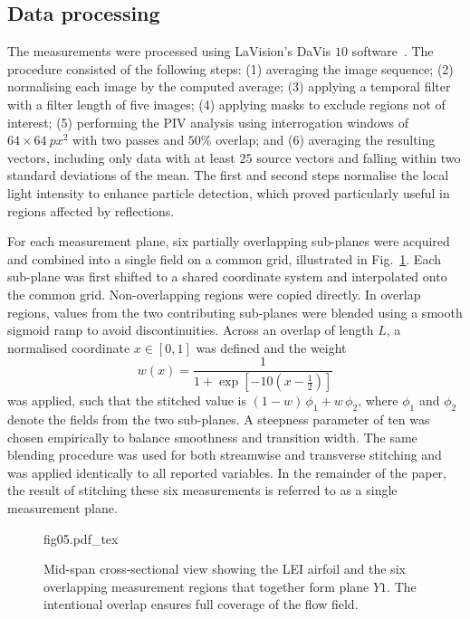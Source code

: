 \documentclass[wes, manuscript]{copernicus}
\begin{document}
\subsection{Data processing}
%
The measurements were processed using LaVision's DaVis $10$ software~\citep{lavision2025}. The procedure consisted of the following steps:
(1) averaging the image sequence;
(2) normalising each image by the computed average;
(3) applying a temporal filter with a filter length of five images;
(4) applying masks to exclude regions not of interest;
(5) performing the PIV analysis using interrogation windows of $64 \times 64~\unit{px^2}$
with two passes and $50\%$ overlap; and
(6) averaging the resulting vectors, including only data with at least $25$ source vectors and falling within two standard deviations of the mean. The first and second steps normalise the local light intensity to enhance particle detection, which proved particularly useful in regions affected by reflections.

For each measurement plane, six partially overlapping sub-planes were acquired and combined into a single field on a common grid, illustrated in Fig.~\ref{fig:overlapping_measurement_planes}. Each sub-plane was first shifted to a shared coordinate system and interpolated onto the common grid. Non-overlapping regions were copied directly. 
In overlap regions, values from the two contributing sub-planes were blended using a smooth sigmoid ramp to avoid discontinuities. Across an overlap of length $L$, a normalised coordinate $x\in[0,1]$ was defined and the weight
\begin{equation}
w(x)=\frac{1}{1+\exp\!\left[-10\left(x-\tfrac{1}{2}\right)\right]}
\end{equation}
was applied, such that the stitched value is $(1-w)\,\phi_1+w\,\phi_2$, where $\phi_1$ and $\phi_2$ denote the fields from the two sub-planes. A steepness parameter of ten was chosen empirically to balance smoothness and transition width. The same blending procedure was used for both streamwise and transverse stitching and was applied identically to all reported variables.
In the remainder of the paper, the result of stitching these six measurements is referred to as a single measurement plane.
%
\begin{figure}[htp]
    \centering
    \def\svgwidth{.6\linewidth}
    {fig05.pdf_tex}
    \caption{Mid-span cross-sectional view showing the LEI airfoil and the six overlapping measurement regions that together form plane $Y1$. The intentional overlap ensures full coverage of the flow field.}
    \label{fig:overlapping_measurement_planes}
\end{figure}
%
\end{document}
